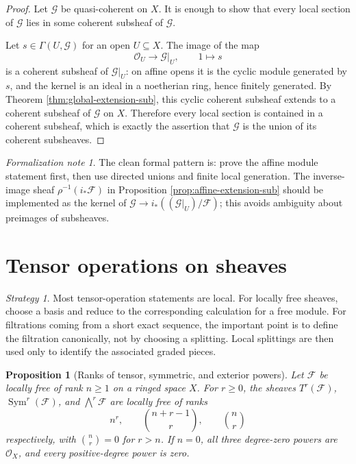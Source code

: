 \documentclass[11pt]{amsart}
\DeclareMathOperator{\Sym}{Sym}
\newcommand{\OO}{\mathcal O}
\newcommand{\F}{\mathscr F}
\newcommand{\G}{\mathscr G}
\theoremstyle{plain}
\newtheorem{proposition}[theorem]{Proposition}
\theoremstyle{definition}
\theoremstyle{remark}
\newtheorem*{strategy}{Strategy}
\newtheorem*{formalization}{Formalization note}
\begin{document}
\begin{proof}
Let $\G$ be quasi-coherent on $X$.  It is enough to show that every local section of $\G$ lies in some coherent subsheaf of $\G$.

Let $s\in \Gamma(U,\G)$ for an open $U\subseteq X$.  The image of the map
\[
  \OO_U \longrightarrow \G|_U,\qquad 1\longmapsto s
\]
is a coherent subsheaf of $\G|_U$: on affine opens it is the cyclic module generated by $s$, and the kernel is an ideal in a noetherian ring, hence finitely generated.  By Theorem \ref{thm:global-extension-sub}, this cyclic coherent subsheaf extends to a coherent subsheaf of $\G$ on $X$.  Therefore every local section is contained in a coherent subsheaf, which is exactly the assertion that $\G$ is the union of its coherent subsheaves.
\end{proof}

\begin{formalization}
The clean formal pattern is: prove the affine module statement first, then use directed unions and finite local generation.  The inverse-image sheaf $\rho^{-1}(i_*\F)$ in Proposition \ref{prop:affine-extension-sub} should be implemented as the kernel of $\G\to i_*((\G|_U)/\F)$; this avoids ambiguity about preimages of subsheaves.
\end{formalization}

\section{Tensor operations on sheaves}

\begin{strategy}
Most tensor-operation statements are local.  For locally free sheaves, choose a basis and reduce to the corresponding calculation for a free module.  For filtrations coming from a short exact sequence, the important point is to define the filtration canonically, not by choosing a splitting.  Local splittings are then used only to identify the associated graded pieces.
\end{strategy}

\begin{proposition}[Ranks of tensor, symmetric, and exterior powers]\label{prop:tensor-ranks}
Let $\F$ be locally free of rank $n\geq 1$ on a ringed space $X$. For $r\geq 0$, the sheaves $T^r(\F)$, $\Sym^r(\F)$, and $\bigwedge^r\F$ are locally free of ranks
\[
  n^r,\qquad \binom{n+r-1}{r},\qquad \binom nr
\]
respectively, with $\binom nr=0$ for $r>n$. If $n=0$, all three degree-zero powers are $\OO_X$, and every positive-degree power is zero.
\end{proposition}
\end{document}
